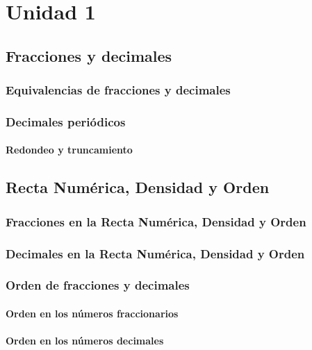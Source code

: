 \documentclass[11pt]{book}
\begin{document}
\pagestyle{empty}

\restoregeometry
\dominitoc[n]
\tableofcontents
\pagestyle{fancy}
\newpage \thispagestyle{empty}
\chapter{Unidad 1}
\pagestyle{fancy}
\newpage
\thispagestyle{plain}
\section{Fracciones y decimales}
\subsection{Equivalencias de fracciones y decimales}
\subsection{Decimales peri\'odicos}
\subsubsection{Redondeo y truncamiento}

\newpage \thispagestyle{plain}

\section{Recta Num\'erica, Densidad y Orden}
\subsection{Fracciones en la Recta Num\'erica, Densidad y Orden}
\subsection{Decimales en la Recta Num\'erica, Densidad y Orden}
\subsection{Orden de fracciones y decimales}
\subsubsection{Orden en los n\'umeros fraccionarios}
\subsubsection{Orden en los n\'umeros decimales}
\end{document}
